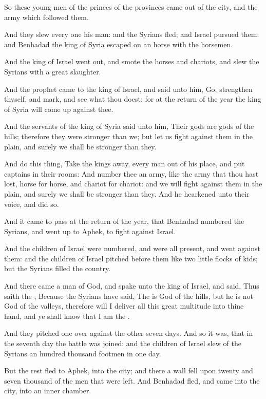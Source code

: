 \Verse So these young men of the princes of the provinces came out of the city, and the army which followed them.

\Verse And they slew every one his man: and the Syrians fled; and Israel pursued them: and Benhadad the king of Syria escaped on an horse with the horsemen.

\Verse And the king of Israel went out, and smote the horses and chariots, and slew the Syrians with a great slaughter.

\Verse And the prophet came to the king of Israel, and said unto him, Go, strengthen thyself, and mark, and see what thou doest: for at the return of the year the king of Syria will come up against thee.

\Verse And the servants of the king of Syria said unto him, Their gods are gods of the hills; therefore they were stronger than we; but let us fight against them in the plain, and surely we shall be stronger than they.

\Verse And do this thing, Take the kings away, every man out of his place, and put captains in their rooms: \Verse And number thee an army, like the army that thou hast lost, horse for horse, and chariot for chariot: and we will fight against them in the plain, and surely we shall be stronger than they. And he hearkened unto their voice, and did so.

\Verse And it came to pass at the return of the year, that Benhadad numbered the Syrians, and went up to Aphek, to fight against Israel.

\Verse And the children of Israel were numbered, and were all present, and went against them: and the children of Israel pitched before them like two little flocks of kids; but the Syrians filled the country.

\Verse And there came a man of God, and spake unto the king of Israel, and said, Thus saith the \LORD, Because the Syrians have said, The \LORD is God of the hills, but he is not God of the valleys, therefore will I deliver all this great multitude into thine hand, and ye shall know that I am the \LORD.

\Verse And they pitched one over against the other seven days. And so it was, that in the seventh day the battle was joined: and the children of Israel slew of the Syrians an hundred thousand footmen in one day.

\Verse But the rest fled to Aphek, into the city; and there a wall fell upon twenty and seven thousand of the men that were left. And Benhadad fled, and came into the city, into an inner chamber.

